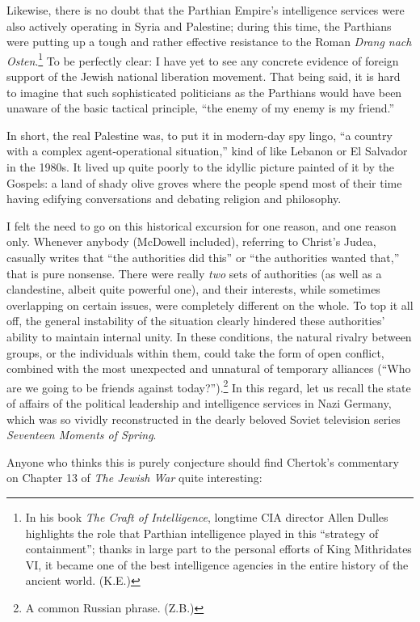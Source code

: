 Likewise, there is no doubt that the Parthian Empire's intelligence services were also actively operating in Syria and Palestine; during this time, the Parthians were putting up a tough and rather effective resistance to the Roman \emph{Drang nach Osten}.\footnote{ In his book \emph{The Craft of Intelligence}, longtime CIA director Allen Dulles highlights the role that Parthian intelligence played in this ``strategy of containment''; thanks in large part to the personal efforts of King Mithridates VI, it became one of the best intelligence agencies in the entire history of the ancient world. (K.E.)} To be perfectly clear: I have yet to see any concrete evidence of foreign support of the Jewish national liberation movement. That being said, it is hard to imagine that such sophisticated politicians as the Parthians would have been unaware of the basic tactical principle, ``the enemy of my enemy is my friend.''

In short, the real Palestine was, to put it in modern-day spy lingo, ``a country with a complex agent-operational situation,'' kind of like Lebanon or El Salvador in the 1980s. It lived up quite poorly to the idyllic picture painted of it by the Gospels: a land of shady olive groves where the people spend most of their time having edifying conversations and debating religion and philosophy.

I felt the need to go on this historical excursion for one reason, and one reason only. Whenever anybody (McDowell included), referring to Christ's Judea, casually writes that ``the authorities did this'' or ``the authorities wanted that,'' that is pure nonsense. There were really \emph{two} sets of authorities (as well as a clandestine, albeit quite powerful one), and their interests, while sometimes overlapping on certain issues, were completely different on the whole. To top it all off, the general instability of the situation clearly hindered these authorities' ability to maintain internal unity. In these conditions, the natural rivalry between groups, or the individuals within them, could take the form of open conflict, combined with the most unexpected and unnatural of temporary alliances (``Who are we going to be friends against today?'').\footnote{ A common Russian phrase. (Z.B.)} In this regard, let us recall the state of affairs of the political leadership and intelligence services in Nazi Germany, which was so vividly reconstructed in the dearly beloved Soviet television series \emph{Seventeen Moments of Spring}.

Anyone who thinks this is purely conjecture should find Chertok's commentary on Chapter 13 of \emph{The Jewish War} quite interesting:


